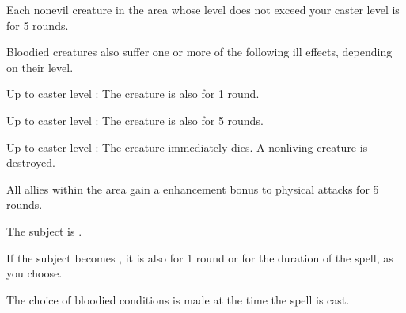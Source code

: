 \begin{spelleffect}
    Each nonevil creature in the area whose level does not exceed your caster level is \sickened for 5 rounds.
    
    Bloodied creatures also suffer one or more of the following ill effects, depending on their level.
    \begin{itemize*}
        \item Up to caster level : The creature is also \nauseated for 1 round.
        \item Up to caster level : The creature is also \paralyzed for 5 rounds.
        \item Up to caster level : The creature immediately dies. A nonliving creature is destroyed.
    \end{itemize*}
\end{spelleffect}

\begin{spellsuccess}
  All allies within the area gain a  enhancement bonus to physical attacks for 5 rounds. \spellbonusscalingdescription
\end{spellsuccess}

\spellrng{\rngclose}
\begin{spellsuccess}
    The subject is \sickened.
    
    If the subject becomes \bloodied, it is also \blinded for 1 round or \deafened for the duration of the spell, as you choose.
\end{spellsuccess}
\begin{spellnotes}
   The choice of bloodied conditions is made at the time the spell is cast.
\end{spellnotes}

